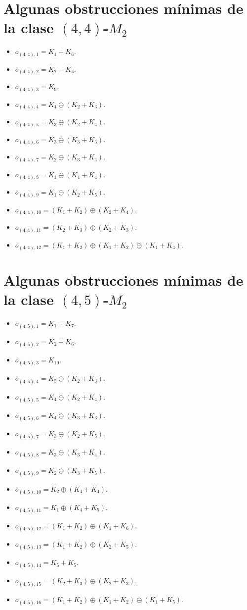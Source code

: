 \section{Algunas obstrucciones mínimas de la clase $(4,4)$-$M_2$}
\begin{itemize}
    \item $o_{(4,4),1} = K_1+K_6$.
    \item $o_{(4,4),2} = K_2+K_5$.
    \item $o_{(4,4),3} = K_9$.
    \item $o_{(4,4),4} = K_4\oplus(K_2+K_3)$.
    \item $o_{(4,4),5} = K_3\oplus(K_2+K_4)$.
    \item $o_{(4,4),6} = K_3\oplus(K_3+K_3)$.
    \item $o_{(4,4),7} = K_2\oplus(K_3+K_4)$.
    \item $o_{(4,4),8} = K_1\oplus(K_4+K_4)$.
    \item $o_{(4,4),9} = K_1\oplus(K_2+K_5)$.
    \item $o_{(4,4),10} = (K_1+K_2)\oplus(K_2+K_4)$.
    \item $o_{(4,4),11} = (K_2+K_3)\oplus(K_2+K_3)$.
    \item $o_{(4,4),12} = (K_1+K_2)\oplus(K_1+K_2)\oplus (K_1+K_4)$.
\end{itemize}

\section{Algunas obstrucciones mínimas de la clase $(4,5)$-$M_2$}
\begin{itemize}
    \item $o_{(4,5),1} = K_1+K_7$.
    \item $o_{(4,5),2} = K_2+K_6$.
    \item $o_{(4,5),3} = K_{10}$.
    \item $o_{(4,5),4} = K_5\oplus(K_2+K_3)$.
    \item $o_{(4,5),5} = K_4\oplus(K_2+K_4)$.
    \item $o_{(4,5),6} = K_4\oplus(K_3+K_3)$.
    \item $o_{(4,5),7} = K_3\oplus(K_2+K_5)$.
    \item $o_{(4,5),8} = K_3\oplus(K_3+K_4)$.
    \item $o_{(4,5),9} = K_2\oplus(K_3+K_5)$.
    \item $o_{(4,5),10} = K_2\oplus(K_4+K_4)$.
    \item $o_{(4,5),11} = K_1\oplus(K_4+K_5)$.
    \item $o_{(4,5),12} = (K_1+K_2)\oplus(K_1+K_6)$.
    \item $o_{(4,5),13} = (K_1+K_2)\oplus(K_2+K_5)$.
    \item $o_{(4,5),14} = K_5+K_5$.
    \item $o_{(4,5),15} = (K_2+K_3)\oplus(K_2+K_3)$.
    \item $o_{(4,5),16} = (K_1+K_2)\oplus(K_1+K_2)\oplus (K_1+K_5)$.
\end{itemize}

